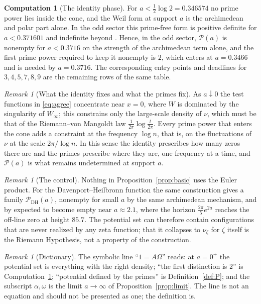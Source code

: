 \documentclass[11pt]{article}
\theoremstyle{definition}
\newtheorem{computation}[proposition]{Computation}
\theoremstyle{remark}
\newtheorem{remark}[proposition]{Remark}
\begin{document}
\begin{computation}[The identity phase]\label{comp:identity}
For $a<\frac12\log2=0.346574$ no prime power lies inside the cone, and the Weil form at support $a$ is the archimedean and polar part alone. In the odd sector this prime-free form is positive definite for $a<0.371601$ and indefinite beyond \cite[Table 1, row $n=2$]{folds}. Hence, in the odd sector, $\mathcal P(a)$ is nonempty for $a<0.3716$ on the strength of the archimedean term alone, and the first prime power required to keep it nonempty is $2$, which enters at $a=0.3466$ and is needed by $a=0.3716$. The corresponding entry points and deadlines for $3,4,5,7,8,9$ are the remaining rows of the same table.
\end{computation}

\begin{remark}[What the identity fixes and what the primes fix]
As $a\downarrow0$ the test functions in \eqref{eq:agree} concentrate near $x=0$, where $W$ is dominated by the singularity of $W_\infty$; this constrains only the large-scale density of $\nu$, which must be that of the Riemann--von Mangoldt law $\frac1{2\pi}\log\frac{t}{2\pi}$. Every prime power that enters the cone adds a constraint at the frequency $\log n$, that is, on the fluctuations of $\nu$ at the scale $2\pi/\log n$. In this sense the identity prescribes how many zeros there are and the primes prescribe where they are, one frequency at a time, and $\mathcal P(a)$ is what remains undetermined at support $a$.
\end{remark}

\begin{remark}[The control]
Nothing in Proposition~\ref{prop:basic} uses the Euler product. For the Davenport--Heilbronn function the same construction gives a family $\mathcal P_{\mathrm{DH}}(a)$, nonempty for small $a$ by the same archimedean mechanism, and by \cite[Remark 12.9]{folds} expected to become empty near $a\approx2.1$, where the horizon $\frac{2\pi}{5}e^{2a}$ reaches the off-line zero at height $85.7$. The potential set can therefore contain configurations that are never realized by any zeta function; that it collapses to $\nu_\zeta$ for $\zeta$ itself is the Riemann Hypothesis, not a property of the construction.
\end{remark}

\begin{remark}[Dictionary]
The symbolic line ``$1=A\Omega$'' reads: at $a=0^+$ the potential set is everything with the right density; ``the first distinction is $2$'' is Computation~\ref{comp:identity}; ``potential defined by the primes'' is Definition~\ref{def:P}; and the subscript $\alpha,\omega$ is the limit $a\to\infty$ of Proposition~\ref{prop:limit}. The line is not an equation and should not be presented as one; the definition is.
\end{remark}
\end{document}
